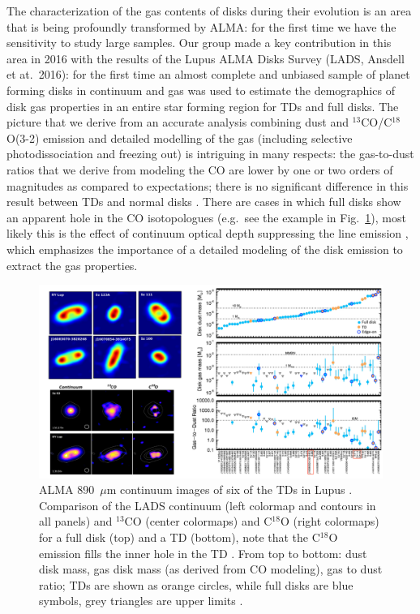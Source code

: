 \documentclass[10pt,fleqn,twoside]{article}
\begin{document}
The characterization of the gas contents of disks during their evolution is an area that is being profoundly transformed by ALMA: for the first time we have the sensitivity to study large samples.
Our group made a key contribution in this area in 2016 with the results of the Lupus ALMA Disks Survey
(LADS, Ansdell et at.~2016): for the first time an almost complete and unbiased sample of planet forming disks in continuum and gas was used to estimate the demographics of disk gas properties in an entire star forming region for TDs and full disks. The picture that we derive from an accurate analysis combining dust and $^{13}$CO/C$^{18}$O(3-2) emission and detailed modelling of the gas (including selective photodissociation and freezing out) is intriguing in many respects: the gas-to-dust ratios that we derive from modeling the CO are lower by one or two orders of magnitudes as compared to expectations; there is no significant difference in this result between TDs and normal disks  \citep[see Fig.~\ref{f_LADS};][]{2016ApJ...828...46A,2016arXiv161201538M}. There are cases in which full disks show an apparent hole in the CO isotopologues (e.g.\ see the example in Fig.~\ref{f_LADS}), most likely this is the effect of continuum optical depth suppressing the line emission \citep[see also][]{Isella2016}, which emphasizes the importance of a detailed modeling of the disk emission to extract the gas properties.

\begin{figure}
\centerline{\includegraphics[scale=0.45]{Figure_Lupus_TDs.pdf}}
\caption{ ALMA 890~$\mu$m continuum images
  of six of the TDs in Lupus \citep[LADS survey; adapted from][]{2016ApJ...828...46A}.  Comparison of the LADS
  continuum (left colormap and contours in all panels) and $^{13}$CO (center
  colormaps) and C$^{18}$O (right colormaps) for a full disk (top) and a TD
  (bottom), note that the C$^{18}$O emission fills the inner hole in the TD
  \citep[adapted from][]{2016ApJ...828...46A}.  From top
  to bottom: dust disk mass, gas disk mass (as derived from CO modeling),
  gas to dust ratio; TDs are shown as orange circles, while full disks are
  blue symbols, grey triangles are upper limits \citep[adapted from][]{2016arXiv161201538M}.}
\label{f_LADS}
\end{figure}
\end{document}
